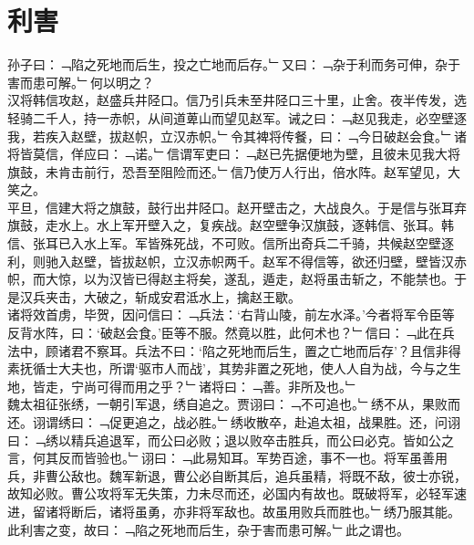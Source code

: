 \chapter{利害}%
孙子曰：﹁陷之死地而后生，投之亡地而后存。﹂又曰：﹁杂于利而务可伸，杂于害而患可解。﹂何以明之？\\
汉将韩信攻赵，赵盛兵井陉口。信乃引兵未至井陉口三十里，止舍。夜半传发，选轻骑二千人，持一赤帜，从间道萆山而望见赵军。诫之曰：﹁赵见我走，必空壁逐我，若疾入赵壁，拔赵帜，立汉赤帜。﹂令其裨将传餐，曰：﹁今日破赵会食。﹂诸将皆莫信，佯应曰：﹁诺。﹂信谓军吏曰：﹁赵已先据便地为壁，且彼未见我大将旗鼓，未肯击前行，恐吾至阻险而还。﹂信乃使万人行出，倍水阵。赵军望见，大笑之。\\
平旦，信建大将之旗鼓，鼓行出井陉口。赵开壁击之，大战良久。于是信与张耳弃旗鼓，走水上。水上军开壁入之，复疾战。赵空壁争汉旗鼓，逐韩信、张耳。韩信、张耳已入水上军。军皆殊死战，不可败。信所出奇兵二千骑，共候赵空壁逐利，则驰入赵壁，皆拔赵帜，立汉赤帜两千。赵军不得信等，欲还归壁，壁皆汉赤帜，而大惊，以为汉皆已得赵主将矣，遂乱，遁走，赵将虽击斩之，不能禁也。于是汉兵夹击，大破之，斩成安君泜水上，擒赵王歇。\\
诸将效首虏，毕贺，因问信曰：﹁兵法：‘右背山陵，前左水泽。’今者将军令臣等反背水阵，曰：‘破赵会食。’臣等不服。然竟以胜，此何术也？﹂信曰：﹁此在兵法中，顾诸君不察耳。兵法不曰：‘陷之死地而后生，置之亡地而后存’？且信非得素抚循士大夫也，所谓‘驱市人而战’，其势非置之死地，使人人自为战，今与之生地，皆走，宁尚可得而用之乎？﹂诸将曰：﹁善。非所及也。﹂
\\
魏太祖征张绣，一朝引军退，绣自追之。贾诩曰：﹁不可追也。﹂绣不从，果败而还。诩谓绣曰：﹁促更追之，战必胜。﹂绣收散卒，赴追太祖，战果胜。还，问诩曰：﹁绣以精兵追退军，而公曰必败；退以败卒击胜兵，而公曰必克。皆如公之言，何其反而皆验也。﹂诩曰：﹁此易知耳。军势百途，事不一也。将军虽善用兵，非曹公敌也。魏军新退，曹公必自断其后，追兵虽精，将既不敌，彼士亦锐，故知必败。曹公攻将军无失策，力未尽而还，必国内有故也。既破将军，必轻军速进，留诸将断后，诸将虽勇，亦非将军敌也。故虽用败兵而胜也。﹂绣乃服其能。\\
此利害之变，故曰：﹁陷之死地而后生，杂于害而患可解。﹂此之谓也。
%
%
